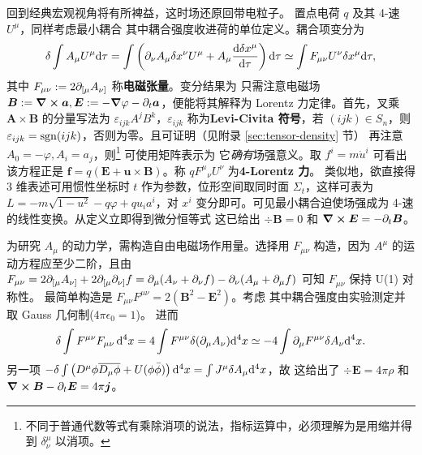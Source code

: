 回到经典宏观视角将有所裨益，这时场还原回带电粒子。
置点电荷 $q$ 及其 4-速 $U^\mu$，同样考虑最小耦合
其中耦合强度收进荷的单位定义。耦合项变分为
\[\delta \int  A_\mu U^\mu\mathrm{d} \tau=\int \left(\partial_\nu A_{\mu} \delta x^\nu U^\mu+A_\mu \frac{\mathrm{d} \delta x^\mu}{\mathrm{d} \tau}\right) \mathrm{d} \tau \simeq \int  F_{\mu \nu} U^\nu \delta x^\mu \mathrm{d} \tau,\]
其中 $F_{\mu \nu}:=2\partial_{[\mu} A_{\nu]}$ 称\textbf{电磁张量}。变分结果为
只需注意电磁场 $\vb* B:=\curl\vb* a,\vb* E:=-\grad\varphi-\partial_t{\vb* a}$，便能将其解释为 Lorentz 力定律。首先，叉乘 $\bm A\times \bm B$ 的分量写法为 $\varepsilon_{ijk} A^j B^k$，$\varepsilon_{ijk}$ 称为\textbf{Levi-Civita 符号}，若 $(ijk)\in S_n$，则 $\varepsilon_{ijk}=\operatorname{sgn}(ijk)$，否则为零。且可证明（见附录 \ref{sec:tensor-density} 节）
再注意 $A_0=-\varphi,A_i=a_j$，则\footnote{不同于普通代数等式有乘除消项的说法，指标运算中，必须理解为是用缩并得到 $\delta^\mu_\nu$ 以消项。}
可使用矩阵表示为
它\textit{确有}场强意义。取 $f^i=m \dot{u}^i$ 可看出该方程正是 $\bm f=q(\bm E+\bm u\times\bm B)$。称 $q F^{\mu}{}_{\nu}U^\nu$ 为\textbf{4-Lorentz 力}。
类似地，欲直接得 3 维表述可用惯性坐标时 $t$ 作为参数，位形空间取同时面 $\Sigma_t$，这样可表为 $L=-m\sqrt{1-u^2}-q\varphi+qu_i a^i$，对 $x^i$ 变分即可。可见最小耦合迫使场强成为 4-速的线性变换。从定义立即得到微分恒等式
这已给出 $\div\bm B=0$ 和 $\curl\vb* E=-\partial_t \vb* B$。

为研究 $A_\mu$ 的动力学，需构造自由电磁场作用量。选择用 $F_{\mu\nu}$ 构造，因为 $A^\mu$ 的运动方程应至少二阶，且由 $F_{\mu\nu}=2\partial_{[\mu}A_{\nu]} + 2\partial_{[\mu} \partial_{\nu]}f=\partial_{\mu} (A_{\nu}+\partial_\nu f)-\partial_{\nu} (A_{\mu}+\partial_\mu f)$ 可知 $F_{\mu\nu}$ 保持 U(1) 对称性。
最简单构造是 $F_{\mu\nu} F^{\mu\nu}=2(\bm B^2-\bm E^2)$。考虑
其中耦合强度由实验测定并取 Gauss 几何制($4\pi\epsilon_0 = 1$)。
进而
\[\delta\int F^{\mu\nu} F_{\mu\nu} \dd[4]{x}=4\int F^{\mu\nu} \delta (\partial_\mu A_\nu) \dd^4 x\simeq -4\int \partial_\mu F^{\mu\nu} \delta A_\nu \dd^4 x.\]
另一项 $-\var\int\left(D^\mu\phi \overline{D_\mu \phi} + U(\phi\bar\phi)\right)\dd[4]x=\int J^\mu \delta A_\mu \dd[4]x$，故
这给出了 $\div\bm E=4\pi \rho$ 和 $\curl\vb* B-\partial_t \vb* E=4\pi \vb* j$。

